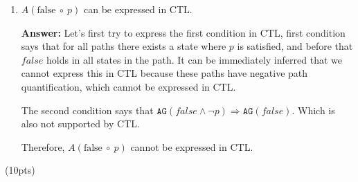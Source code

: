 \documentclass[11pt]{article}
\newcommand{\ag}[1]{\texttt{AG}(#1)}
\begin{document}
\begin{enumerate}
\begin{enumerate}
\item $A(\mbox{false}\ \circ\ p)$ can be expressed in CTL.

\textbf{Answer:} Let's first try to express the first condition in CTL, first condition says that for all paths there exists a state where $p$ is
  satisfied, and before that $false$ holds in all states in the path. It can be immediately inferred that we cannot express this in CTL because these paths have negative path quantification, which cannot be expressed in CTL. 


  The second condition says that  $\ag{false \land \neg p} \Rightarrow \ag{false}$. Which is also not supported by CTL. 

  Therefore, $A(\mbox{false}\ \circ\ p)$ cannot be expressed in CTL. 

\end{enumerate}
\hfill(10pts)


\end{enumerate}
\end{document}
